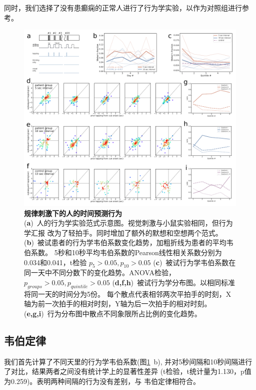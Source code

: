 同时，我们选择了没有患癫痫的正常人进行了行为学实验，以作为对照组进行参考。

\bigskip

\begin{figure}[h]
    \centering
    \includegraphics[width=\textwidth]{src/figures/human_behavior.pdf}
    \caption{\textbf{规律刺激下的人的时间预测行为}\\
    (\textbf{a})~人的行为学实验范式示意图。视觉刺激与小鼠实验相同，但行为学汇报
    改为了轻拍手。同时增加了额外的默想和空想两个范式。
    (\textbf{b})~被试患者的行为学韦伯系数变化趋势，加粗折线为患者的平均韦伯系数。
    5秒和10秒平均韦伯系数的Pearson线性相关系数分别为0.034和0.041，t检验 $p_5 > 0.05, p_{10} > 0.05$
    (\textbf{c})~被试行为学韦伯系数在同一天中不同分数下的变化趋势。ANOVA检验，$p_{groups} > 0.05, p_{quintile} > 0.05$
    (\textbf{d,f,h})~被试行为学分布图。以相同标准将同一天的时间分为5份。
    每个散点代表相邻两次平拍手的时刻，X轴为前一次拍手的相对时刻，Y轴为后一次拍手的相对时刻。
    (\textbf{e,g,i})~行为分布图中散点不同象限所占比例的变化趋势。}
    \label{fig:human_behavior}
\end{figure}

\subsection{韦伯定律}
我们首先计算了不同天里的行为学韦伯系数(图\ref{fig:human_behavior}~b),
并对5秒间隔和10秒间隔进行了对比，结果两者之间没有统计学上的显著性差异
(t检验，t统计量为1.130，p值为0.259)。表明两种间隔的行为没有差别，与
韦伯定律相符合\cite{gibbon1977scalar, hardy2018encoding}。

